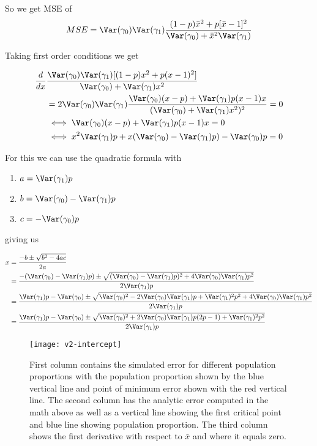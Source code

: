So we get MSE of
\begin{align*}
	MSE &= \Var(\gamma_0) \Var(\gamma_1) \frac{(1-p) \bar{x}^2 + p[\bar{x} - 1]^2 }{\Var(\gamma_0) + \bar{x}^2 \Var(\gamma_1)}\\
\end{align*} 

Taking first order conditions we get

\begin{align*}
	\frac{d}{dx} &\frac{\Var(\gamma_0) \Var(\gamma_1) [ (1 - p) x^2 + p (x - 1)^2 ]}{\Var(\gamma_0) + \Var(\gamma_1) x^2} \\
&= 2 \Var(\gamma_0) \Var(\gamma_1) \frac{ \Var(\gamma_0) (x - p) + \Var(\gamma_1) p (x - 1) x }{(\Var(\gamma_0) + \Var(\gamma_1) x^2)^2} = 0 \\
&\iff \Var(\gamma_0) (x - p) + \Var(\gamma_1) p (x - 1) x = 0 \\
&\iff x^2 \Var(\gamma_1) p + x(\Var(\gamma_0) - \Var(\gamma_1) p) - \Var(\gamma_0) p = 0
\end{align*} 

For this we can use the quadratic formula with
\begin{enumerate}
	\item $a = \Var(\gamma_1) p$
	\item $b = \Var(\gamma_0) - \Var(\gamma_1) p$
	\item $c = - \Var(\gamma_0) p$
\end{enumerate}

giving us

\begin{align*}
	x &= \frac{-b \pm \sqrt{b^2 - 4ac}}{2a} \\
	  &= \frac{-(\Var(\gamma_0) - \Var(\gamma_1) p) \pm \sqrt{(\Var(\gamma_0) - \Var(\gamma_1) p)^2 + 4 \Var(\gamma_0) \Var(\gamma_1) p^2 }}{2 \Var(\gamma_1) p} \\
	  &= \frac{\Var(\gamma_1) p-\Var(\gamma_0)  \pm \sqrt{\Var(\gamma_0)^2 - 2\Var(\gamma_0) \Var(\gamma_1) p + \Var(\gamma_1)^2 p^2 + 4 \Var(\gamma_0) \Var(\gamma_1) p^2 }}{2 \Var(\gamma_1) p} \\
	  &= \frac{\Var(\gamma_1) p-\Var(\gamma_0)  \pm \sqrt{\Var(\gamma_0)^2 + 2\Var(\gamma_0) \Var(\gamma_1) p(2p -1) + \Var(\gamma_1)^2 p^2}}{2 \Var(\gamma_1) p} \\
\end{align*} 


\begin{figure}[ht!]
  \centering
	\texttt{[image: v2-intercept]}
	\caption{First column contains the simulated error for different population proportions with the population proportion shown by the blue vertical line and point of minimum error shown with the red vertical line. The second column has the analytic error computed in the math above as well as a vertical line showing the first critical point and blue line showing population proportion. The third column shows the first derivative with respect to $\bar{x}$ and where it equals zero.} 
\end{figure}

